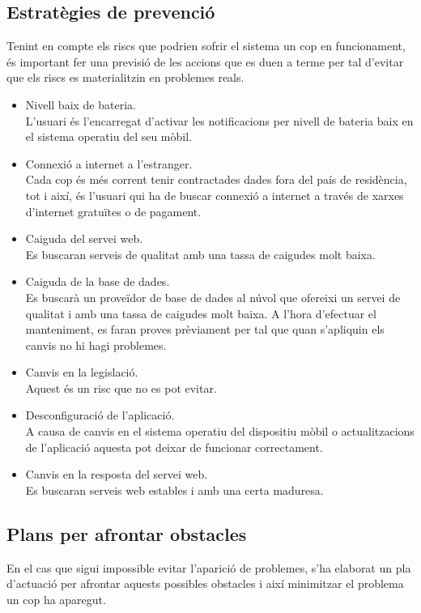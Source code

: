 \subsection{Estratègies de prevenció}
Tenint en compte els riscs que podrien sofrir el sistema un cop en funcionament, és important fer una previsió de les accions que es duen a terme per tal d'evitar que els riscs es materialitzin en problemes reals.
\begin{itemize}
\item{}Nivell baix de bateria.\\
L'usuari és l'encarregat d'activar les notificacions per nivell de bateria
baix en el sistema operatiu del seu mòbil.
\item{}Connexió a internet a l'estranger.\\
Cada cop és més corrent tenir contractades dades fora del país de residència, tot i així, és l'usuari qui ha de buscar connexió a internet a través de xarxes d'internet gratuïtes o de pagament.
\item{}Caiguda del servei web.\\
Es buscaran serveis de qualitat amb una tassa de caigudes molt baixa.
\item{}Caiguda de la base de dades.\\
Es buscarà un proveïdor de base de dades al núvol que ofereixi un servei
de qualitat i amb una tassa de caigudes molt baixa. A l'hora d'efectuar el
manteniment, es faran proves prèviament per tal que quan s'apliquin
els canvis no hi hagi problemes.
\item{}Canvis en la legislació.\\
Aquest és un risc que no es pot evitar.
\item{}Desconfiguració de l'aplicació.\\
A causa de canvis en el sistema operatiu del dispositiu mòbil o actualitzacions de l'aplicació aquesta pot deixar de funcionar correctament.
\item{}Canvis en la resposta del servei web.\\
Es buscaran serveis web estables i amb una certa maduresa.

\end{itemize}

\subsection{Plans per afrontar obstacles}

En el cas que sigui impossible evitar l'aparició de problemes, s'ha elaborat un pla d'actuació per afrontar aquests possibles obstacles i així minimitzar el problema un cop ha aparegut.

